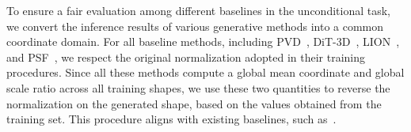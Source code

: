 To ensure a fair evaluation among different baselines in the unconditional task, we convert the inference results of various generative methods into a common coordinate domain.
%
For all baseline methods, including PVD~\cite{zhou2021pvd}, DiT-3D~\cite{mo2023dit3d}, LION~\cite{zeng2022lion}, and PSF~\cite{wu2023psf}, we respect the original normalization adopted in their training procedures.
%
Since all these methods compute a global mean coordinate and global scale ratio across all training shapes, we use these two quantities to reverse the normalization on the generated shape, based on the values obtained from the training set.
%
This procedure aligns with existing baselines, such as~\cite{yang2019pointflow,zeng2022lion}.
